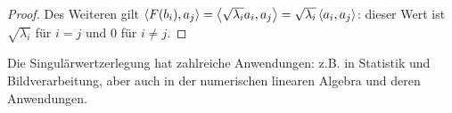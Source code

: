 \begin{proof}
		Des Weiteren gilt $\left\langle  F(b_i) , a_j \right\rangle  = \left\langle  \sqrt{\lambda_i} a_i, a_j \right\rangle = \sqrt{\lambda_i} \left\langle  a_i, a_j \right\rangle$: dieser Wert ist $\sqrt{\lambda_i}$ für $i=j$ und $0$ für $i \ne j$. 
	\end{proof} 
	
	
	Die Singulärwertzerlegung hat zahlreiche Anwendungen: z.B. in Statistik und Bildverarbeitung, aber auch in der numerischen linearen Algebra und deren Anwendungen. 
	
	
	

